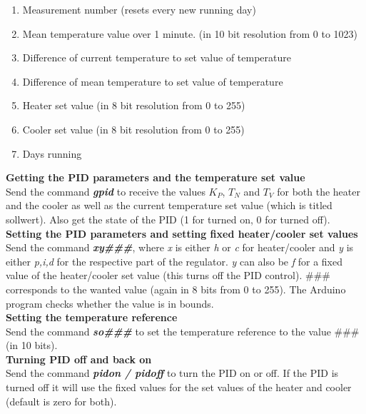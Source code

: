 \documentclass[12pt]{scrartcl}
\begin{document}
      \begin{enumerate}
        \item Measurement number (resets every new running day)
        \item Mean temperature value over 1 minute. (in 10 bit resolution from 0 to 1023)
        \item Difference of current temperature to set value of temperature
        \item Difference of mean temperature to set value of temperature
        \item Heater set value (in 8 bit resolution from 0 to 255)
        \item Cooler set value (in 8 bit resolution from 0 to 255)
        \item Days running
      \end{enumerate}
      \hspace{10pt}

      \noindent\textbf{Getting the PID parameters and the temperature set value} \\
      Send the command \textbf{\textit{gpid}} to receive the values $K_P$, $T_N$
      and $T_V$ for both the heater and the cooler as well as the current
      temperature set value (which is titled sollwert). Also get the state of
      the PID (1 for turned on, 0 for turned off).\\

      \noindent\textbf{Setting the PID parameters and setting fixed heater/cooler
      set values} \\
      Send the command \textbf{\textit{xy\#\#\#}}, where \textit{x} is either
      \textit{h} or \textit{c} for heater/cooler and \textit{y} is either
      \textit{p,i,d} for the respective part of the regulator. \textit{y} can
      also be \textit{f} for a fixed value of the heater/cooler set value (this
      turns off the PID control). \#\#\# corresponds to the wanted value (again in
      8 bits from 0 to 255). The Arduino program checks whether the value is
      in bounds.\\

      \noindent\textbf{Setting the temperature reference}\\
      Send the command \textbf{\textit{so\#\#\#}} to set the temperature
      reference to the value \#\#\# (in 10 bits).\\

      \noindent\textbf{Turning PID off and back on}\\
      Send the command \textbf{\textit{pidon / pidoff}} to turn the PID on or off.
      If the PID is turned off it will use the fixed values for the set values of
      the heater and cooler (default is zero for both).\\
\end{document}
